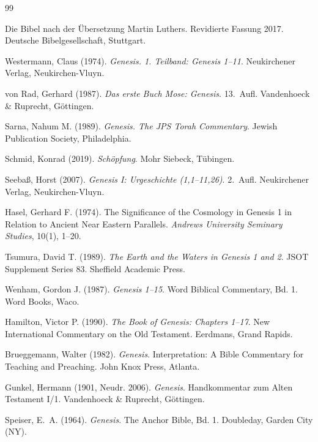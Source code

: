 ﻿\documentclass[a4paper,12pt]{article}
\theoremstyle{definition}
\begin{document}
\begin{thebibliography}{99}
	
	Die Bibel nach der Übersetzung Martin Luthers.
	Revidierte Fassung 2017.
	Deutsche Bibelgesellschaft, Stuttgart.
	
	Westermann, Claus (1974).
	\textit{Genesis. 1. Teilband: Genesis 1--11}.
	Neukirchener Verlag, Neukirchen-Vluyn.
	
	von Rad, Gerhard (1987).
	\textit{Das erste Buch Mose: Genesis}.
	13.~Aufl. Vandenhoeck \& Ruprecht, Göttingen.
	
	Sarna, Nahum M. (1989).
	\textit{Genesis. The JPS Torah Commentary}.
	Jewish Publication Society, Philadelphia.
	
	Schmid, Konrad (2019).
	\textit{Schöpfung}.
	Mohr Siebeck, Tübingen.
	
	Seeba\ss, Horst (2007).
	\textit{Genesis I: Urgeschichte (1,1--11,26)}.
	2.~Aufl. Neukirchener Verlag, Neukirchen-Vluyn.
	
	Hasel, Gerhard F. (1974).
	The Significance of the Cosmology in Genesis 1 in Relation to Ancient Near
	Eastern Parallels.
	\textit{Andrews University Seminary Studies}, 10(1), 1--20.
	
	Tsumura, David T. (1989).
	\textit{The Earth and the Waters in Genesis 1 and 2}.
	JSOT Supplement Series 83. Sheffield Academic Press.
	
	
	Wenham, Gordon J. (1987).
	\textit{Genesis 1--15}.
	Word Biblical Commentary, Bd. 1. Word Books, Waco.
	
	Hamilton, Victor P. (1990).
	\textit{The Book of Genesis: Chapters 1--17}.
	New International Commentary on the Old Testament.
	Eerdmans, Grand Rapids.
	
	Brueggemann, Walter (1982).
	\textit{Genesis}.
	Interpretation: A Bible Commentary for Teaching and Preaching.
	John Knox Press, Atlanta.
	
	Gunkel, Hermann (1901, Neudr. 2006).
	\textit{Genesis}.
	Handkommentar zum Alten Testament I/1.
	Vandenhoeck \& Ruprecht, Göttingen.
	
	Speiser, E.~A. (1964).
	\textit{Genesis}.
	The Anchor Bible, Bd. 1.
	Doubleday, Garden City (NY).
	

\end{thebibliography}
\end{document}

